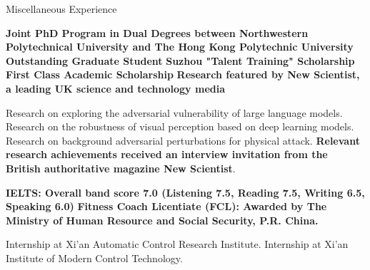 \begin{rubric}{Miscellaneous Experience}


\entry*[2024-2026] \textbf{Joint PhD Program in Dual Degrees between Northwestern Polytechnical University and The Hong Kong Polytechnic University}
\entry*[2023-2025] \textbf{Outstanding Graduate Student}
\entry*[2023] \textbf{Suzhou "Talent Training" Scholarship}
\entry*[2023-2024] \textbf{First Class Academic Scholarship}
\entry*[2023] \textbf{Research featured by New Scientist, a leading UK science and technology media}

\vspace{-0.8cm}

\entry*[03/2024-Present] Research on exploring the adversarial vulnerability of large language models.
\entry*[09/2022-02/2024] Research on the robustness of visual perception based on deep learning models.
\entry*[12/2021-08/2022] Research on background adversarial perturbations for physical attack. \textbf{Relevant research achievements received an interview invitation from the British authoritative magazine New Scientist}.

\vspace{-0.8cm}

\entry*[04/2022] \textbf{IELTS: Overall band score 7.0 (Listening 7.5, Reading 7.5, Writing 6.5, Speaking 6.0)}
\entry*[07/2017] \textbf{Fitness Coach Licentiate (FCL): Awarded by The Ministry of Human Resource and Social Security, P.R. China.}


\vspace{-0.8cm}

\entry*[07/2021-09/2021] Internship at Xi'an Automatic Control Research Institute.
\entry*[07/2020-09/2020] Internship at Xi'an Institute of Modern Control Technology.

\end{rubric}